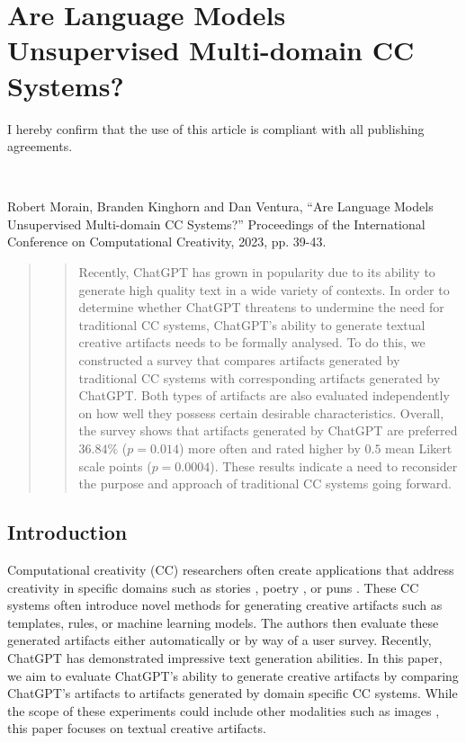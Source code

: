 \documentclass[phd,electronic,oneside,twosidetoc,letterpaper,chaptercenter,parttop,lof]{byumsphd}
\begin{document}
\chapter{Are Language Models Unsupervised Multi-domain CC Systems?} 

I hereby confirm that the use of this article is compliant with all publishing agreements.

\

\noindent
Robert Morain, Branden Kinghorn and Dan Ventura, ``Are Language Models Unsupervised Multi-domain CC Systems?'' Proceedings of the International Conference on Computational Creativity, 2023, pp. 39-43.
\begin{abstract}
\begin{quote}

Recently, ChatGPT has grown in popularity due to its ability to generate high quality text in a wide variety of contexts.  In order to determine whether ChatGPT threatens to undermine the need for traditional CC systems, ChatGPT's ability to generate textual creative artifacts needs to be formally analysed.
To do this, we constructed a survey that compares artifacts generated by traditional CC systems with corresponding artifacts generated by ChatGPT.
Both types of artifacts are also evaluated independently on how well they possess certain desirable characteristics.  Overall, the survey shows that artifacts generated by ChatGPT are preferred $36.84\%$ ($p=0.014$) more often and rated higher by $0.5$ mean Likert scale points ($p=0.0004$).
These results indicate a need to reconsider the purpose and approach of traditional CC systems going forward.

\end{quote}
\end{abstract}

\section{Introduction}

Computational creativity (CC) researchers often create applications that address creativity in specific domains such as stories \cite{perez2001mexica}, poetry \cite{boggia2022poetry}, or puns \cite{ritchie2003jape}.
These CC systems often introduce novel methods for generating creative artifacts such as templates, rules, or machine learning models.
The authors then evaluate these generated artifacts either automatically or by way of a user survey. 
Recently, ChatGPT \cite{chatGPT} has demonstrated impressive text generation abilities. 
In this paper, we aim to evaluate ChatGPT's ability to generate creative artifacts by comparing ChatGPT's artifacts to artifacts generated by domain specific CC systems.
While the scope of these experiments could include other modalities such as images \cite{ramesh2021dalle}, this paper focuses on textual creative artifacts.
\end{document}
